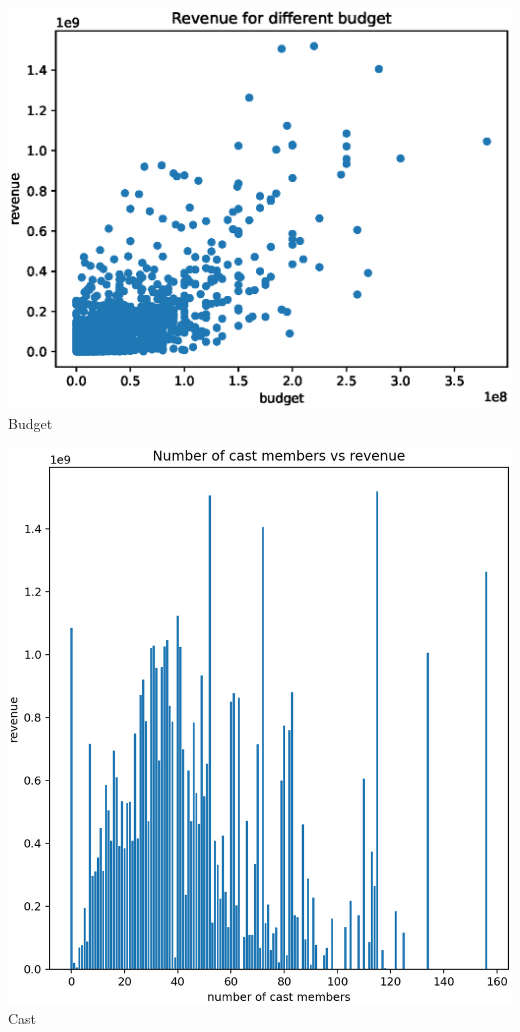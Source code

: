 \begin{center}
  \begin{minipage}{0.3\linewidth}
  \centering
    \includegraphics[width=0.8\linewidth]{figures//budget.eps}
  {\small{Budget}}
  \end{minipage}
  \hfill
  \begin{minipage}{0.3\linewidth}
  \centering
    \includegraphics[width=0.8\linewidth]{figures//cest.eps}\\
  {\small{Cast}}
  \end{minipage}
  \hfill
  \begin{minipage}{0.3\linewidth}
  \centering

\end{minipage}
\end{center}
